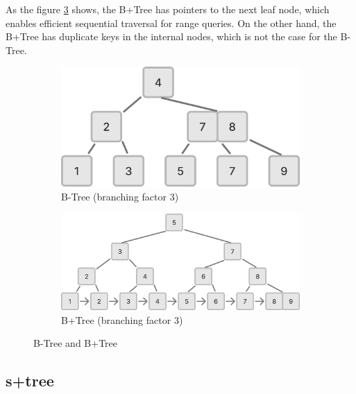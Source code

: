 As the figure \ref{fig:btree_bplus_tree} shows, the B+Tree has pointers to the next leaf node, which enables efficient sequential traversal for range queries. On the other hand, the B+Tree has duplicate keys in the internal nodes, which is not the case for the B-Tree.

\begin{figure}[ht]
  \centering
  \begin{subfigure}[b]{0.45\textwidth}
    \centering
    \includegraphics[width=\textwidth]{figs/related_work_theoretical_bg/btree.png}
    \caption{B-Tree (branching factor 3)}
    \label{fig:btree}
  \end{subfigure}
  \hfill
  \begin{subfigure}[b]{0.45\textwidth}
    \centering
    \includegraphics[width=\textwidth]{figs/related_work_theoretical_bg/bplus_tree.png}
    \caption{B+Tree (branching factor 3)}
    \label{fig:bplus_tree}
  \end{subfigure}
  \caption{B-Tree and B+Tree}
  \label{fig:btree_bplus_tree}
\end{figure}

\subsection{\texorpdfstring{\ac{s+tree}}{S+tree}}
\label{tb:stree}

